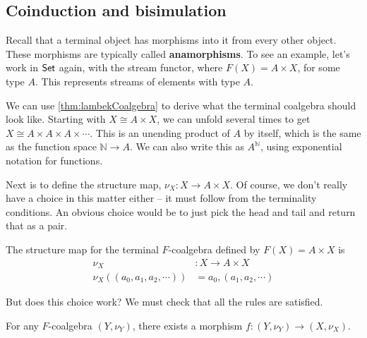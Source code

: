 \subsection{Coinduction and bisimulation}

Recall that a terminal object has morphisms into it from every other object.
These morphisms are typically called \textbf{anamorphisms}.
To see an example, let's work in $\mathsf{Set}$ again, with the stream functor, where $F(X) = A \times X$, for some type $A$.
This represents streams of elements with type $A$.

We can use \cref{thm:lambekCoalgebra} to derive what the terminal coalgebra should look like.
Starting with $X \cong A \times X$, we can unfold several times to get $X \cong A \times A \times A \times \cdots$.
This is an unending product of $A$ by itself, which is the same as the function space $\mathbb{N} \rightarrow A$.
We can also write this as $A^\mathbb{N}$, using exponential notation for functions.

Next is to define the structure map, $\nu_X : X \rightarrow A \times X$.
Of course, we don't really have a choice in this matter either -- it must follow from the terminality conditions.
An obvious choice would be to just pick the head and tail and return that as a pair.

\begin{definition}
    \label{def:reassociateHeadTail}
    The structure map for the terminal $F$-coalgebra defined by $F(X) = A \times X$ is 
    \begin{align*}
        \nu_X &: X \rightarrow A \times X \\
        \nu_X ((a_0, a_1, a_2, \cdots)) &= a_0, (a_1, a_2, \cdots)
    \end{align*}
\end{definition}

But does this choice work?
We must check that all the rules are satisfied.

\begin{lemma}
    \label{lem:fExists}
    For any $F$-coalgebra $(Y, \nu_Y)$, there exists a morphism $f : (Y, \nu_Y) \rightarrow (X, \nu_X)$.
\end{lemma}

